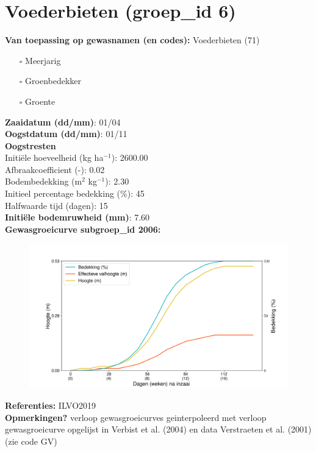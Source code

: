 \documentclass{article}
\begin{document}
 \section{Voederbieten (groep\_id 6)} 
 \textbf{Van toepassing op gewasnamen (en codes):} Voederbieten (71) 
 \begin{multicols}{3} \begin{itemize} \item[$\square$] Meerjarig \item[$\square$] Groenbedekker \item[$\square$] Groente \end{itemize} \end{multicols} 
  \textbf{Zaaidatum (dd/mm)}: 01/04  \vspace{0.10cm} \\ 
  \textbf{Oogstdatum (dd/mm)}: 01/11  \vspace{0.10cm} \\ 
  \textbf{Oogstresten} \vspace{0.05cm} \\ 
  \tab Initi\"{e}le hoeveelheid (kg ha$^{-1}$): 2600.00 \vspace{0.05cm} \\ 
  \tab Afbraakcoefficient (-): 0.02 \vspace{0.05cm} \\ 
  \tab Bodembedekking (m$^2$ kg$^{-1}$): 2.30 \vspace{0.05cm} \\ 
  \tab Initieel percentage bedekking (\%): 45 \vspace{0.05cm} \\ 
  \tab Halfwaarde tijd (dagen): 15 \vspace{0.05cm} \\ 
  \textbf{Initi\"{e}le bodemruwheid (mm)}: 7.60 \vspace{0.05cm} \\ 
  \textbf{Gewasgroeicurve subgroep\_id 2006:} 
 \begin{center} \begin{figure}[H] \includegraphics[width=12.5cm]{temp/2006.png} \end{figure} \end{center} 
  \textbf{Referenties:} ILVO2019 \vspace{0.10cm} \\ 
  \textbf{Opmerkingen?} verloop gewasgroeicurves geinterpoleerd met verloop gewasgroeicurve opgelijst in Verbist et al. (2004) en data Verstraeten et al. (2001) (zie code GV) \vspace{0.10cm} \\ 
 \newpage 
\end{document}
